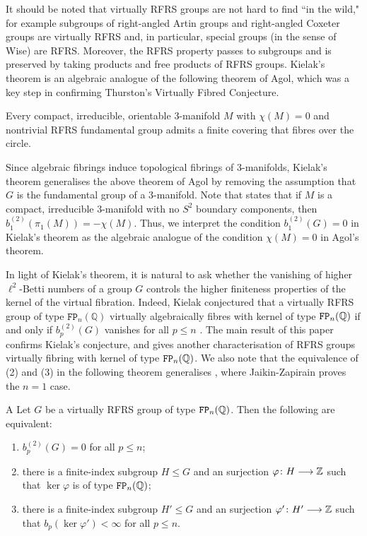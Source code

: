 \documentclass[11pt, letterpaper]{amsart}
\begin{document}
It should be noted that virtually RFRS groups are not hard to find ``in the wild," for example subgroups of right-angled Artin groups and right-angled Coxeter groups are virtually RFRS and, in particular, special groups (in the sense of Wise) are RFRS. Moreover, the RFRS property passes to subgroups and is preserved by taking products and free products of RFRS groups. Kielak's theorem is an algebraic analogue of the following theorem of Agol, which was a key step in confirming Thurston's Virtually Fibred Conjecture. 

\begin{thm}
Every compact, irreducible, orientable $3$-manifold $M$ with $\chi(M) = 0$ and nontrivial RFRS fundamental group admits a finite covering that fibres over the circle.
\end{thm}

Since algebraic fibrings induce topological fibrings of $3$-manifolds, Kielak's theorem generalises the above theorem of Agol by removing the assumption that $G$ is the fundamental group of a $3$-manifold. Note that \cite[Theorem 4.1]{Luck02} states that if $M$ is a compact, irreducible $3$-manifold with no $S^2$ boundary components, then $b_1^{(2)}(\pi_1(M)) = -\chi(M)$. Thus, we interpret the condition $b_1^{(2)}(G) = 0$ in Kielak's theorem as the algebraic analogue of the condition $\chi(M) = 0$ in Agol's theorem.

In light of Kielak's theorem, it is natural to ask whether the vanishing of higher $\ell^2$-Betti numbers of a group $G$ controls the higher finiteness properties of the kernel of the virtual fibration. Indeed, Kielak conjectured that a virtually RFRS group of type $\mathtt{FP}_n(\mathbb{Q})$ virtually algebraically fibres with kernel of type $\mathtt{FP}_n(\mathbb{Q})$ if and only if $b_p^{(2)}(G)$ vanishes for all $p \leqslant n$ \cite[Conjecture 8]{KielakOber20}. The main result of this paper confirms Kielak's conjecture, and gives another characterisation of RFRS groups virtually fibring with kernel of type $\mathtt{FP}_n(\mathbb{Q})$. We also note that the equivalence of (2) and (3) in the following theorem generalises \cite[Corollary 1.5]{JaikinZapirain2020THEUO}, where Jaikin-Zapirain proves the $n = 1$ case.

\begin{manualtheorem}{A}\label{thm:A}
Let $G$ be a virtually RFRS group of type $\mathtt{FP}_n(\mathbb{Q})$. Then the following are equivalent:
    \begin{enumerate}[label = (\arabic*)]
        \item\label{item:b2vanish} $b_p^{(2)}(G) = 0$ for all $p \leqslant n$;
        \item\label{item:FPn} there is a finite-index subgroup $H \leqslant G$ and an surjection $\varphi \colon H \longrightarrow \mathbb{Z}$ such that $\ker \varphi$ is of type $\mathtt{FP}_n(\mathbb{Q})$;
        \item\label{item:finiteBetti} there is a finite-index subgroup $H' \leqslant G$ and an surjection $\varphi' \colon H' \longrightarrow \mathbb{Z}$ such that $b_p(\ker \varphi') < \infty$ for all $p \leqslant n$.
    \end{enumerate}
\end{manualtheorem}
\end{document}
